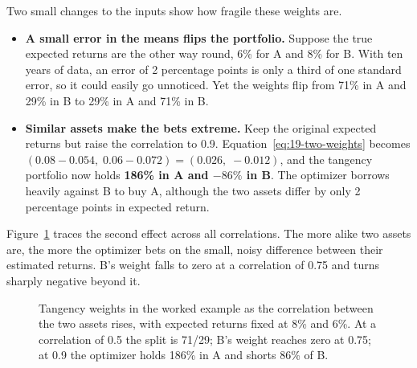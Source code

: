Two small changes to the inputs show how fragile these weights are.
\begin{itemize}
  \item \textbf{A small error in the means flips the portfolio.} Suppose the true expected returns are the other way round, 6\% for A and 8\% for B. With ten years of data, an error of 2 percentage points is only a third of one standard error, so it could easily go unnoticed. Yet the weights flip from 71\% in A and 29\% in B to 29\% in A and 71\% in B.
  \item \textbf{Similar assets make the bets extreme.} Keep the original expected returns but raise the correlation to 0.9. Equation~\eqref{eq:19-two-weights} becomes $(0.08 - 0.054,\; 0.06 - 0.072) = (0.026,\; -0.012)$, and the tangency portfolio now holds \textbf{186\% in A and $-86\%$ in B}. The optimizer borrows heavily against B to buy A, although the two assets differ by only 2 percentage points in expected return.
\end{itemize}

Figure~\ref{fig:19-weights} traces the second effect across all correlations. The more alike two assets are, the more the optimizer bets on the small, noisy difference between their estimated returns. B's weight falls to zero at a correlation of 0.75 and turns sharply negative beyond it.

\begin{figure}[htbp]
\centering
{}
\caption{Tangency weights in the worked example as the correlation between the two assets rises, with expected returns fixed at 8\% and 6\%. At a correlation of 0.5 the split is 71/29; B's weight reaches zero at 0.75; at 0.9 the optimizer holds 186\% in A and shorts 86\% of B.}
\label{fig:19-weights}
\end{figure}

